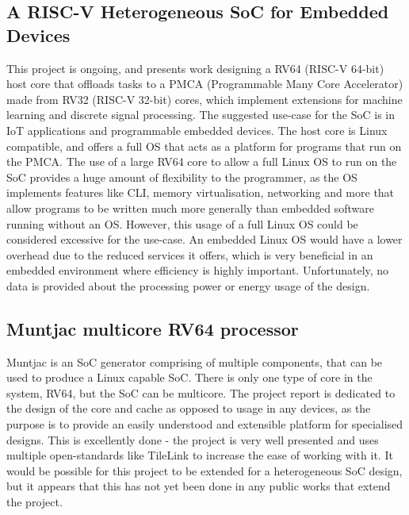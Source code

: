 \subsection{A RISC-V Heterogeneous SoC for Embedded Devices\cite{valenterisc}}
This project is ongoing, and presents work designing a RV64 (RISC-V 64-bit) host core that offloads tasks to a PMCA (Programmable Many Core Accelerator) made from RV32 (RISC-V 32-bit) cores, which implement extensions for machine learning and discrete signal processing. The suggested use-case for the SoC is in IoT applications and programmable embedded devices. The host core is Linux compatible, and offers a full OS that acts as a platform for programs that run on the PMCA. The use of a large RV64 core to allow a full Linux OS to run on the SoC provides a huge amount of flexibility to the programmer, as the OS implements features like CLI, memory virtualisation, networking and more that allow programs to be written much more generally than embedded software running without an OS. However, this usage of a full Linux OS could be considered excessive for the use-case. An embedded Linux OS would have a lower overhead due to the reduced services it offers, which is very beneficial in an embedded environment where efficiency is highly important. Unfortunately, no data is provided about the processing power or energy usage of the design.

\subsection{Muntjac multicore RV64 processor\cite{UCAM-CL-TR-972}}
Muntjac is an SoC generator comprising of multiple components, that can be used to produce a Linux capable SoC. There is only one type of core in the system, RV64, but the SoC can be multicore. The project report is dedicated to the design of the core and cache as opposed to usage in any devices, as the purpose is to provide an easily understood and extensible platform for specialised designs. This is excellently done - the project is very well presented and uses multiple open-standards like TileLink\cite{tilelink} to increase the ease of working with it. It would be possible for this project to be extended for a heterogeneous SoC design, but it appears that this has not yet been done in any public works that extend the project.